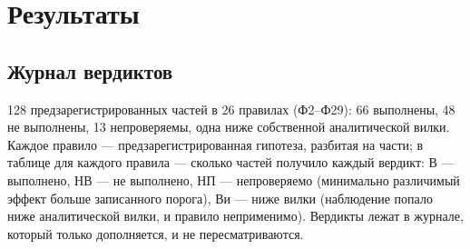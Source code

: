 \documentclass[11pt,a4paper]{article}
\theoremstyle{remark}
\begin{document}
\section{Результаты}\label{sec:results}
\subsection{Журнал вердиктов}
128 предзарегистрированных частей в 26 правилах (Ф2--Ф29): 66 выполнены, 48 не
выполнены, 13 непроверяемы, одна ниже собственной аналитической вилки. Каждое правило
--- предзарегистрированная гипотеза, разбитая на части; в таблице для каждого правила
--- сколько частей получило каждый вердикт: В --- выполнено, НВ --- не выполнено, НП
--- непроверяемо (минимально различимый эффект больше записанного порога), Ви --- ниже
вилки (наблюдение попало ниже аналитической вилки, и правило неприменимо). Вердикты
лежат в журнале, который только дополняется, и не пересматриваются.
\end{document}
